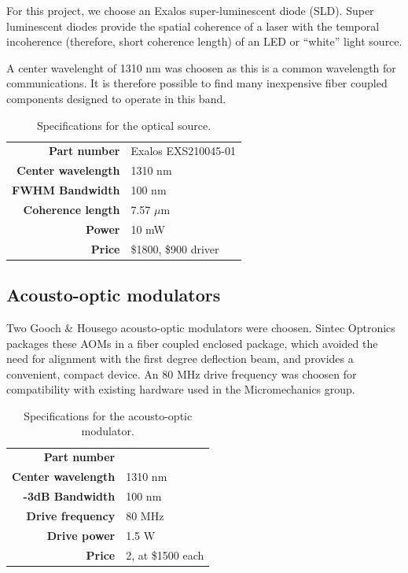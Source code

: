 For this project, we choose an Exalos super-luminescent diode (SLD). Super luminescent diodes provide the spatial coherence of a laser with the temporal incoherence (therefore, short coherence length) of an LED or ``white'' light source.

A center wavelenght of 1310 nm was choosen as this is a common wavelength for communications. It is therefore possible to find many inexpensive fiber coupled components designed to operate in this band.

\begin{table}[h!]
\centering
\begin{tabular}{ >{\bf}r | l}
Part number & Exalos EXS210045-01 \\
Center wavelength & 1310 nm \\
FWHM Bandwidth & 100 nm \\
Coherence length & 7.57 $\mu$m \\
Power & 10 mW \\
Price & \$1800, \$900 driver \\
\end{tabular}
\caption{Specifications for the optical source.}
\end{table} 

\subsection{Acousto-optic modulators}

Two Gooch \& Housego acousto-optic modulators were choosen. Sintec Optronics packages these AOMs in a fiber coupled enclosed package, which avoided the need for alignment with the first degree deflection beam, and provides a convenient, compact device. An 80 MHz drive frequency was choosen for compatibility with existing hardware used in the Micromechanics group. 

\begin{table}[h!]
\centering
\begin{tabular}{ >{\bf}r | l}
Part number & \\
Center wavelength & 1310 nm \\
-3dB Bandwidth & 100 nm \\
Drive frequency & 80 MHz \\
Drive power & 1.5 W \\
Price & 2, at \$1500 each \\
\end{tabular}
\caption{Specifications for the acousto-optic modulator.}
\end{table} 


